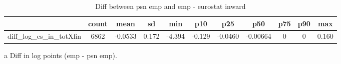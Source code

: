 \begin{table}[h]\scriptsize\caption{Diff between psn emp and emp - eurostat inward}\centering
\begin{threeparttable}\begin{tabular}{l*{10}c}\toprule
            &       count&        mean&          sd&         min&         p10&         p25&         p50&         p75&         p90&         max\\
\midrule
diff\_log\_es\_in\_totXfin&        6862&     -0.0533&       0.172&      -4.394&      -0.129&     -0.0460&    -0.00664&           0&           0&       0.160\\
\bottomrule\end{tabular}\begin{tablenotes}
\item[a] Diff in log points (emp - psn emp).
\end{tablenotes}\end{threeparttable}\end{table}
